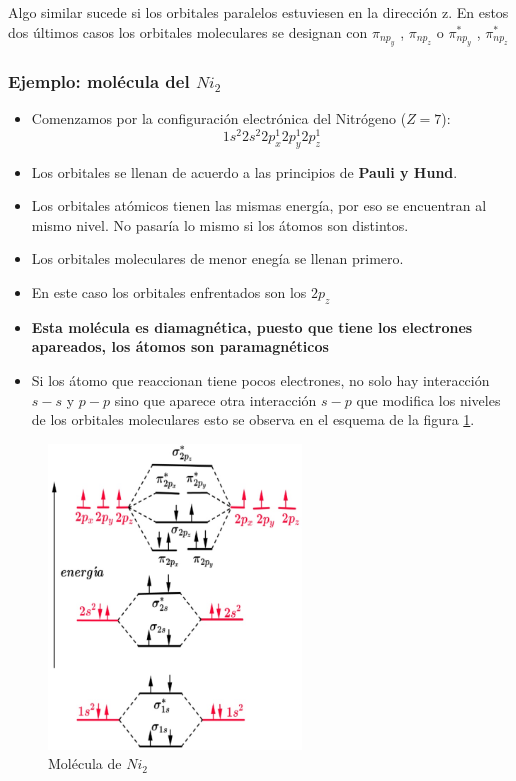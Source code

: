 	
Algo similar sucede si los orbitales paralelos estuviesen en la dirección z. En estos dos últimos casos los orbitales moleculares se designan con $\pi_{np_{y}}$ , $\pi_{np_{z}}$ o $\pi_{np_{y}}^{*}$ , $\pi_{np_{z}}^{*}$

\subsubsection{Ejemplo: molécula del $Ni_{2}$}

\begin{itemize}
	\item Comenzamos por la configuración electrónica del Nitrógeno ($Z=7$):
	\begin{equation}
		1s^{2}2s^{2}2p^{1}_{x}2p^{1}_{y}2p^{1}_{z}
	\end{equation}
	\item Los orbitales se llenan de acuerdo a las principios de \textbf{Pauli y Hund}. 
	\item Los orbitales atómicos tienen las mismas energía, por eso se encuentran al mismo nivel. No pasaría lo mismo si los átomos son distintos.
	\item Los orbitales moleculares de menor enegía se llenan primero.
	\item En este caso los orbitales enfrentados son los $2p_{z}$
	\item \textbf{Esta molécula es diamagnética, puesto que tiene los electrones apareados, los átomos son paramagnéticos}
	\item Si los átomo que reaccionan tiene pocos electrones, no solo hay interacción $s-s$ y $p-p$ sino que aparece otra interacción $s-p$ que modifica los niveles de los orbitales moleculares esto se observa en el esquema de la figura \ref{fig:EjemploNi2}.
\end{itemize}

\begin{figure}[H]
    \centering
    \includegraphics[width=0.6\textwidth]{./Figures/EjemploNi2}
	\caption{Molécula de $Ni_{2}$}
	\label{fig:EjemploNi2}
\end{figure}

